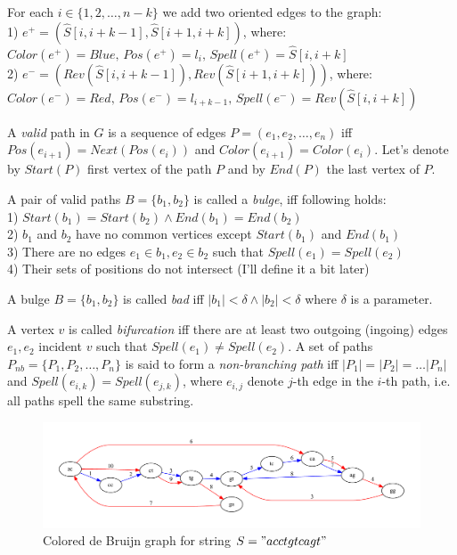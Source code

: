 \documentclass[a4paper,12pt]{scrartcl}
\begin{document}
For each \(i \in \lbrace{1, 2, \ldots, n - k} \rbrace \) we add two oriented edges to the graph: \\
1) \(e^+ = (\hat{S}[i, i + k - 1], \hat{S}[i + 1, i + k]) \), where: \\
\(Color(e^+) = Blue, \,  Pos(e^+) = l_i, \, Spell(e^+) = \hat{S}[i, i + k] \) \\
2) \(e^- = (Rev(\hat{S}[i, i + k - 1]), Rev(\hat{S}[i + 1, i + k]))\), where: \\
 \(Color(e^-) = Red, \, Pos(e^-) = l_{i + k - 1}, \, Spell(e^-) = Rev(\hat{S}[i, i + k])\)

A \textit{valid} path in \(G\) is a sequence of edges \(P = (e_{1}, e_{2}, \ldots, e_{n})\) iff \(Pos(e_{i+1})  = Next(Pos(e_{i}))\) and
\(Color(e_{i + 1}) = Color(e_{i})\). Let's denote by \(Start(P)\) first vertex of the path \(P\) and by \(End(P)\) the last vertex of \(P\).

\newpage

A pair of valid paths \(B =\lbrace b_{1}, b_{2} \rbrace \)
is called a \textit{bulge}, iff following holds: \\
1) \(Start(b_{1}) = Start(b_{2}) \wedge End(b_{1}) = End(b_{2}) \) \\
2) \(b_{1}\) and \(b_{2}\) have no common vertices except \(Start(b_{1})\) and \(End(b_{1})\) \\
3) There are no edges \(e_{1} \in b_{1}, e_{2} \in b_{2} \) such that \(Spell(e_{1}) = Spell(e_{2})\) \\
4) Their sets of positions do not intersect (I'll define it a bit later) 

A bulge \(B =\lbrace b_{1}, b_{2} \rbrace \) is called \textit{bad} iff \(|b_1| < \delta \wedge |b_2| < \delta\) where \(\delta\) is a parameter.

A vertex \(v\) is called \textit{bifurcation} iff there are at least two outgoing (ingoing) edges \(e_{1}, e_{2}\) 
incident \(v\) such that \(Spell(e_{1}) \neq Spell(e_{2})\). A set of paths \(P_{nb} = \lbrace P_{1}, P_{2}, \ldots, P_{n} \rbrace\)
is said to form a \textit{non-branching path} iff \(|P_{1}| = |P_{2}| = \ldots |P_{n}| \) and \(Spell(e_{i, k}) = Spell(e_{j, k}) \),
where \(e_{i, j}\) denote \(j\)-th edge in the \(i\)-th path, i.e. all paths spell the same substring.

\begin{figure}
	\includegraphics[scale = 0.50]{graph3.pdf}
	\small \caption{Colored de Bruijn graph for string \(S = "acctgtcagt" \) }
	\label{ColoredDeBruijn}
\end{figure}
\end{document}
